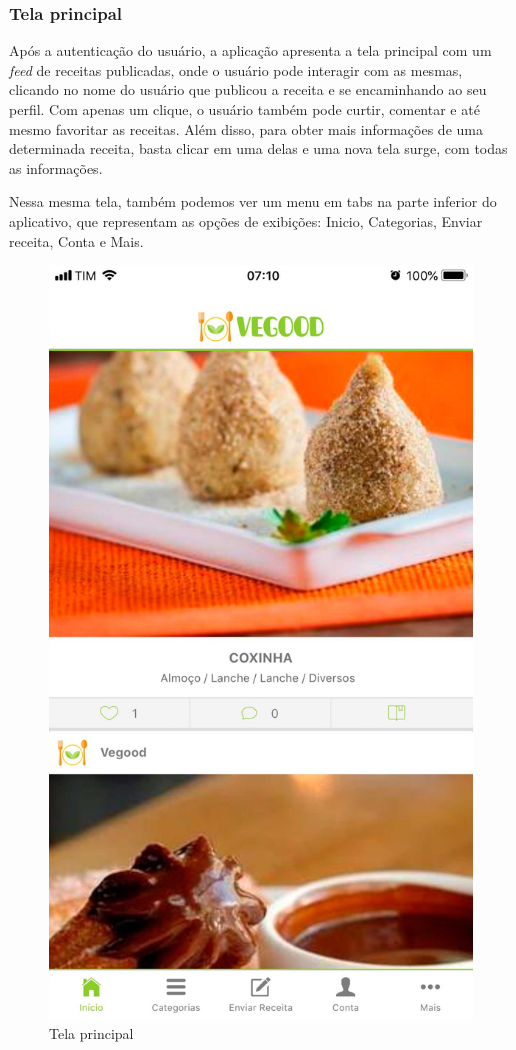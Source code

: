 \subsubsection{Tela principal}
Após a autenticação do usuário, a aplicação apresenta a tela principal com um \textit{feed} de receitas publicadas, onde o usuário pode interagir com as mesmas, clicando no nome do usuário que publicou a receita e se encaminhando ao seu perfil. Com apenas  um clique, o usuário também pode curtir, comentar e até mesmo favoritar as receitas. Além disso, para obter mais informações de uma determinada receita, basta clicar em uma delas e uma nova tela surge, com todas as informações.

Nessa mesma tela, também podemos ver um menu em tabs na parte inferior do aplicativo, que representam as opções de exibições: Inicio, Categorias, Enviar receita, Conta e Mais.

\begin{figure}[H]
	\caption{\label{fig:tela-de-2}Tela principal}
	\centering
	\includegraphics[scale=0.15]{imagens/figura13.jpg}
\end{figure}

